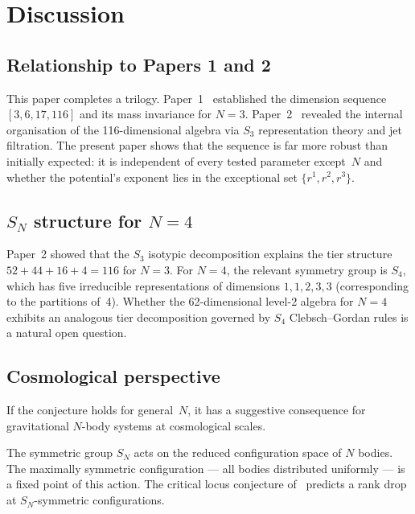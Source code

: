 \documentclass[11pt,a4paper]{article}
\theoremstyle{remark}
\newcommand{\SN}{S_N}
\begin{document}
\section{Discussion}
\label{sec:discussion}

\subsection{Relationship to Papers 1 and 2}

This paper completes a trilogy.  Paper~1~\cite{paper1}
established the dimension sequence $[3, 6, 17, 116]$ and
its mass invariance for $N{=}3$.
Paper~2~\cite{paper2} revealed the internal organisation
of the 116-dimensional algebra via $S_3$ representation
theory and jet filtration.  The present paper shows that
the sequence is far more robust than initially expected:
it is independent of every tested parameter except~$N$
and whether the potential's exponent lies in the
exceptional set $\{r^1, r^2, r^3\}$.

\subsection{$S_N$ structure for $N{=}4$}

Paper~2 showed that the $S_3$ isotypic decomposition
explains the tier structure $52 + 44 + 16 + 4 = 116$
for $N{=}3$.  For $N{=}4$, the relevant symmetry group
is $S_4$, which has five irreducible representations
of dimensions $1, 1, 2, 3, 3$ (corresponding to the
partitions of~4).  Whether the
62-dimensional level-2 algebra for $N{=}4$ exhibits an
analogous tier decomposition governed by $S_4$
Clebsch--Gordan rules is a natural open question.

\subsection{Cosmological perspective}

If the conjecture holds for general~$N$, it has a
suggestive consequence for gravitational $N$-body
systems at cosmological scales.

The symmetric group $\SN$ acts on the reduced
configuration space of $N$ bodies.  The maximally
symmetric configuration --- all bodies distributed
uniformly --- is a fixed point of this action.  The
critical locus conjecture of~\cite{paper1} predicts a
rank drop at $\SN$-symmetric configurations.
\end{document}
